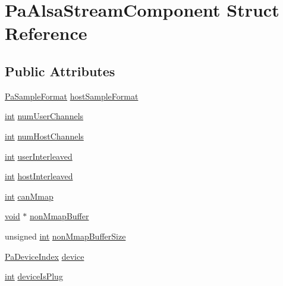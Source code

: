 \hypertarget{struct_pa_alsa_stream_component}{}\section{Pa\+Alsa\+Stream\+Component Struct Reference}
\label{struct_pa_alsa_stream_component}
\subsection*{Public Attributes}
\begin{DoxyCompactItemize}
\item 
\hyperlink{portaudio_8h_a4582d93c2c2e60e12be3d74c5fe00b96}{Pa\+Sample\+Format} \hyperlink{struct_pa_alsa_stream_component_a1fc676cfdb28a43f9ee7d941b7ac94f8}{host\+Sample\+Format}
\item 
\hyperlink{xmltok_8h_a5a0d4a5641ce434f1d23533f2b2e6653}{int} \hyperlink{struct_pa_alsa_stream_component_a0e902bdf00aa3f7e9adc258c434ee99c}{num\+User\+Channels}
\item 
\hyperlink{xmltok_8h_a5a0d4a5641ce434f1d23533f2b2e6653}{int} \hyperlink{struct_pa_alsa_stream_component_ac7a139db0deff683430298928f20a341}{num\+Host\+Channels}
\item 
\hyperlink{xmltok_8h_a5a0d4a5641ce434f1d23533f2b2e6653}{int} \hyperlink{struct_pa_alsa_stream_component_aae34cf96e56f05ce576baa7df06d5045}{user\+Interleaved}
\item 
\hyperlink{xmltok_8h_a5a0d4a5641ce434f1d23533f2b2e6653}{int} \hyperlink{struct_pa_alsa_stream_component_aaa329e397c4b1afd453a1652f572363c}{host\+Interleaved}
\item 
\hyperlink{xmltok_8h_a5a0d4a5641ce434f1d23533f2b2e6653}{int} \hyperlink{struct_pa_alsa_stream_component_a95ddfb65dc825b91524f7d6b5f0fe004}{can\+Mmap}
\item 
\hyperlink{sound_8c_ae35f5844602719cf66324f4de2a658b3}{void} $\ast$ \hyperlink{struct_pa_alsa_stream_component_af5ba1c53cd31f35d1474aa5575200450}{non\+Mmap\+Buffer}
\item 
unsigned \hyperlink{xmltok_8h_a5a0d4a5641ce434f1d23533f2b2e6653}{int} \hyperlink{struct_pa_alsa_stream_component_aa34fb77349c23b3e10d1a588c3d8f106}{non\+Mmap\+Buffer\+Size}
\item 
\hyperlink{portaudio_8h_ad79317e65bde63d76c4b8e711ac5a361}{Pa\+Device\+Index} \hyperlink{struct_pa_alsa_stream_component_a7194a0ca74245ec54df327760b54d94e}{device}
\item 
\hyperlink{xmltok_8h_a5a0d4a5641ce434f1d23533f2b2e6653}{int} \hyperlink{struct_pa_alsa_stream_component_a551815cd6a86d58ea632f63e8962c5dd}{device\+Is\+Plug}

\end{DoxyCompactItemize}
